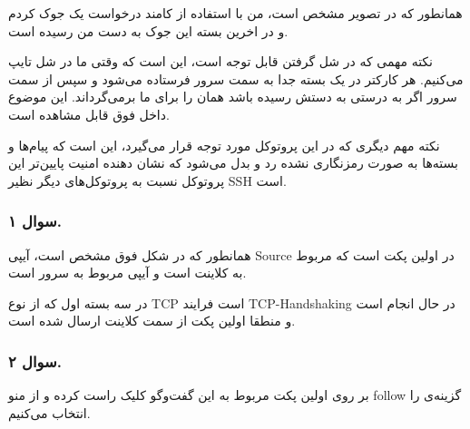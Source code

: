 همانطور که در تصویر مشخص است، من با استفاده از کامند 
درخواست یک جوک کردم و در اخرین بسته این جوک به دست من رسیده است.

نکته مهمی که در شل گرفتن قابل توجه است، این است که وقتی ما در شل تایپ می‌کنیم. هر کارکتر در یک بسته جدا به سمت سرور فرستاده می‌شود و سپس از سمت سرور اگر به درستی به دستش رسیده باشد همان را برای ما برمی‌گرداند. این موضوع داخل 
فوق قابل مشاهده است.


نکته مهم دیگری که در این پروتوکل مورد توجه قرار می‌گیرد، این است که پیام‌ها و بسته‌ها به صورت رمزنگاری نشده رد و بدل می‌شود که نشان دهنده امنیت پایین‌تر این پروتوکل نسبت به پروتوکل‌های دیگر نظیر SSH است.

\subsubsection*{سوال ۱.}


{
}

همانطور که در شکل فوق مشخص است، آیپی Source در اولین پکت 
است که مربوط به کلاینت است و آیپی 
مربوط به سرور است.

در سه بسته اول که از نوع TCP است فرایند TCP-Handshaking در حال انجام است و منطقا اولین پکت از سمت کلاینت ارسال شده است.

\subsubsection*{سوال ۲.}

بر روی اولین پکت مربوط به این گفت‌وگو کلیک راست کرده و از منو follow گزینه‌ی 
را انتخاب می‌کنیم.

{
}


